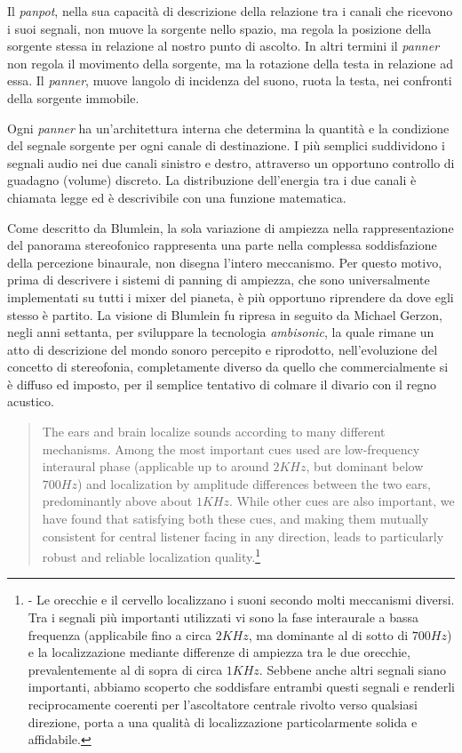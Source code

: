Il \emph{panpot}, nella sua capacità di descrizione della relazione tra i canali
che ricevono i suoi segnali, non muove la sorgente nello spazio, ma regola la
posizione della sorgente stessa in relazione al nostro punto di ascolto. In
altri termini il \emph{panner} non regola il movimento della sorgente, ma la
rotazione della testa in relazione ad essa. Il \emph{panner}, muove langolo di
incidenza del suono, ruota la testa, nei confronti della sorgente immobile.

Ogni \emph{panner} ha un'architettura interna che determina la quantità e la
condizione del segnale sorgente per ogni canale di destinazione. I più semplici
suddividono i segnali audio nei due canali sinistro e destro, attraverso un
opportuno controllo di guadagno (volume) discreto. La distribuzione dell'energia
tra i due canali è chiamata legge ed è descrivibile con una funzione matematica.

Come descritto da Blumlein, la sola variazione di ampiezza nella
rappresentazione del panorama stereofonico rappresenta una parte nella complessa
soddisfazione della percezione binaurale, non disegna l'intero meccanismo.
Per questo motivo, prima di descrivere i sistemi di panning di ampiezza, che
sono universalmente implementati su tutti i mixer del pianeta, è più opportuno
riprendere da dove egli stesso è partito. La visione di Blumlein fu ripresa in
seguito da Michael Gerzon, negli anni settanta, per sviluppare la tecnologia
\emph{ambisonic}, la quale rimane un atto di descrizione del mondo sonoro
percepito e riprodotto, nell'evoluzione del concetto di stereofonia, completamente diverso
da quello che commercialmente si è diffuso ed imposto, per il semplice tentativo
di colmare il divario con il regno acustico.

\begin{quote}
The ears and brain localize sounds according to many different mechanisms. Among
the most important cues used are low-frequency interaural phase (applicable up
to around $2KHz$, but dominant below $700Hz$) and localization by
amplitude differences between the two ears, predominantly above about
$1KHz$. While other cues are also important, we have found that satisfying
both these cues, and making them mutually consistent for central listener facing
in any direction, leads to particularly robust and reliable localization
quality.\footnote{\cite{mg92pdmsss} - Le orecchie e il cervello localizzano i
suoni secondo molti meccanismi diversi. Tra i segnali più importanti utilizzati
vi sono la fase interaurale a bassa frequenza (applicabile fino a circa $2KHz$,
ma dominante al di sotto di $700Hz$) e la localizzazione mediante
differenze di ampiezza tra le due orecchie, prevalentemente al di sopra di
circa $1KHz$. Sebbene anche altri segnali siano importanti, abbiamo
scoperto che soddisfare entrambi questi segnali e renderli reciprocamente
coerenti per l'ascoltatore centrale rivolto verso qualsiasi direzione, porta
a una qualità di localizzazione particolarmente solida e affidabile.}
\end{quote}

